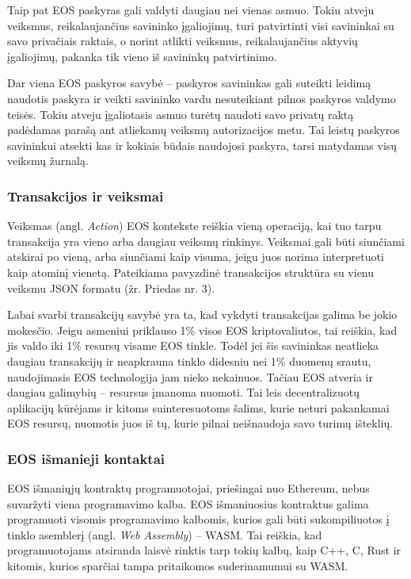 \documentclass{VUMIFPSkursinis}
\begin{document}
Taip pat EOS paskyras gali valdyti daugiau nei vienas asmuo. Tokiu atveju veiksmus, reikalaujančius savininko įgaliojimų, turi patvirtinti visi savininkai su savo privačiais raktais, o norint atlikti veiksmus, reikalaujančius aktyvių įgaliojimų, pakanka tik vieno iš savininkų patvirtinimo.

Dar viena EOS paskyros savybė – paskyros savininkas gali suteikti leidimą naudotis paskyra ir veikti savininko vardu nesuteikiant pilnos paskyros valdymo teisės. Tokiu atveju įgaliotasis asmuo turėtų naudoti savo privatų raktą padėdamas parašą ant atliekamų veiksmų autorizacijos metu. Tai leistų paskyros savininkui atsekti kas ir kokiais būdais naudojosi paskyra, tarsi matydamas visų veiksmų žurnalą.

\subsubsection{Transakcijos ir veiksmai}
Veiksmas (angl. \textit{Action}) EOS kontekste reiškia vieną operaciją, kai tuo tarpu transakcija yra vieno arba daugiau veiksmų rinkinys. Veiksmai gali būti siunčiami atskirai po vieną, arba siunčiami kaip visuma, jeigu juos norima interpretuoti kaip atominį vienetą. Pateikiama pavyzdinė transakcijos struktūra su vienu veiksmu JSON formatu (žr. Priedas nr. 3).

Labai svarbi transakcijų savybė yra ta, kad vykdyti transakcijas galima be jokio mokesčio. Jeigu asmeniui priklauso 1\% visos EOS kriptovaliutos, tai reiškia, kad jis valdo iki 1\% resursų visame EOS tinkle. Todėl jei šis savininkas neatlieka daugiau transakcijų ir neapkrauna tinklo didesniu nei 1\% duomenų srautu, naudojimasis EOS technologija jam nieko nekainuos. Tačiau EOS atveria ir daugiau galimybių – resursus įmanoma nuomoti. Tai leis decentralizuotų aplikacijų kūrėjams ir kitoms suinteresuotoms šalims, kurie neturi pakankamai EOS resursų, nuomotis juos iš tų, kurie pilnai neišnaudoja savo turimų išteklių.

\subsubsection{EOS išmanieji kontaktai}
EOS išmaniųjų kontraktų programuotojai, priešingai nuo Ethereum, nebus suvaržyti viena programavimo kalba. EOS išmaniuosius kontraktus galima programuoti visomis programavimo kalbomis, kurios gali būti sukompiliuotos į tinklo asemblerį (angl. \textit{Web Assembly}) – WASM. Tai reiškia, kad programuotojams atsiranda laisvė rinktis tarp tokių kalbų, kaip C++, C, Rust ir kitomis, kurios sparčiai tampa pritaikomos suderinamumui su WASM.
\end{document}
